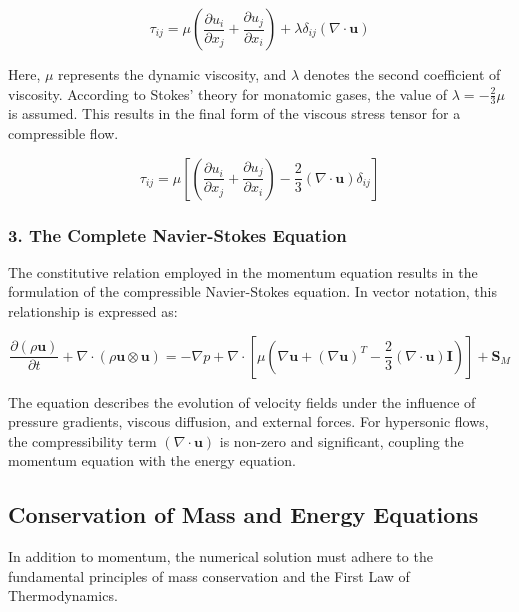 \begin{equation}
    \tau_{ij} = \mu \left( \frac{\partial u_i}{\partial x_j} + \frac{\partial u_j}{\partial x_i} \right) + \lambda \delta_{ij} (\nabla \cdot \mathbf{u})
\end{equation}

Here, $\mu$ represents the dynamic viscosity, and $\lambda$ denotes the second coefficient of viscosity. According to Stokes' theory for monatomic gases, the value of $\lambda = -\frac{2}{3}\mu$is assumed. This results in the final form of the viscous stress tensor for a compressible flow.

\begin{equation}
    \tau_{ij} = \mu \left[ \left( \frac{\partial u_i}{\partial x_j} + \frac{\partial u_j}{\partial x_i} \right) - \frac{2}{3} (\nabla \cdot \mathbf{u}) \delta_{ij} \right]
\end{equation}

\subsubsection*{3. The Complete Navier-Stokes Equation}
The constitutive relation employed in the momentum equation results in the formulation of the compressible Navier-Stokes equation. In vector notation, this relationship is expressed as:

\begin{equation}
    \frac{\partial (\rho \mathbf{u})}{\partial t} + \nabla \cdot (\rho \mathbf{u} \otimes \mathbf{u}) = -\nabla p + \nabla \cdot \left[ \mu \left( \nabla \mathbf{u} + (\nabla \mathbf{u})^T - \frac{2}{3} (\nabla \cdot \mathbf{u}) \mathbf{I} \right) \right] + \mathbf{S}_M
\end{equation}

The equation describes the evolution of velocity fields under the influence of pressure gradients, viscous diffusion, and external forces. For hypersonic flows, the compressibility term $(\nabla \cdot \mathbf{u})$ is non-zero and significant, coupling the momentum equation with the energy equation.

\subsection{Conservation of Mass and Energy Equations}

In addition to momentum, the numerical solution must adhere to the fundamental principles of mass conservation and the First Law of Thermodynamics.

